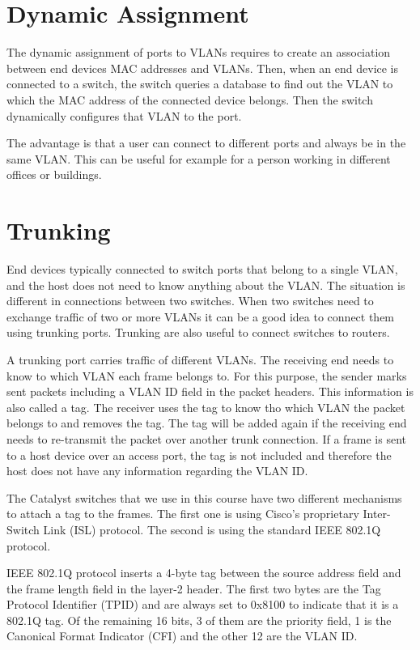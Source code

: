 \section{Dynamic Assignment}

The dynamic assignment of ports to VLANs requires to create an association between end devices MAC addresses and VLANs.
Then, when an end device is connected to a switch, the switch queries a database to find out the VLAN to which the MAC address of the connected device belongs.
Then the switch dynamically configures that VLAN to the port.

The advantage is that a user can connect to different ports and always be in the same VLAN.
This can be useful for example for a person working in different offices or buildings.

\section{Trunking}

End devices typically connected to switch ports that belong to a single VLAN, and the host does not need to know anything about the VLAN.
The situation is different in connections between two switches.
When two switches need to exchange traffic of two or more VLANs it can be a good idea to connect them using trunking ports.
Trunking are also useful to connect switches to routers.

A trunking port carries traffic of different VLANs.
The receiving end needs to know to which VLAN each frame belongs to.
For this purpose, the sender marks sent packets including a VLAN ID field in the packet headers.
This information is also called a tag.
The receiver uses the tag to know tho which VLAN the packet belongs to and removes the tag.
The tag will be added again if the receiving end needs to re-transmit the packet over another trunk connection.
If a frame is sent to a host device over an access port, the tag is not included and therefore the host does not have any information regarding the VLAN ID.

The Catalyst switches that we use in this course have two different mechanisms to attach a tag to the frames.
The first one is using Cisco's proprietary Inter-Switch Link (ISL) protocol.
The second is using the standard IEEE 802.1Q protocol.

IEEE 802.1Q protocol inserts a 4-byte tag between the source address field and the frame length field in the layer-2 header.
The first two bytes are the Tag Protocol Identifier (TPID) and are always set to 0x8100 to indicate that it is a 802.1Q tag.
Of the remaining 16 bits, 3 of them are the priority field, 1 is the Canonical Format Indicator (CFI) and the other 12 are the VLAN ID.

